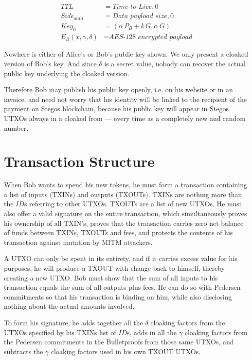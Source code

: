 \documentclass[8pt,fleqn,openany]{book}
\begin{document}
\begin{align*}
TTL &= \textit{Time-to-Live}, 0 \\
Side_{data} &= \textit{Data payload size}, 0 \\
Key_{\alpha} &= (\alpha \, P_{B} + k \, G, \alpha \, G ) \\
E_B(x, \gamma, \delta) &= \textit{AES-128 encrypted payload}
\end{align*}

Nowhere is either of Alice’s or Bob’s public key shown. We only present a cloaked version of Bob’s key. And since $\delta$ is a secret value, nobody can recover the actual public key underlying the cloaked version. 

Therefore Bob may publish his public key openly, i.e. on his website or in an invoice, and need not worry that his identity will be linked to the recipient of the payment on Stegos blockchain, because his public key will appear in Stegos UTXOs always in a cloaked from — every time as a completely new and random number.

\section{Transaction Structure}

When Bob wants to spend his new tokens, he must form a transaction containing a list of inputs (TXINs) and outputs (TXOUTs). TXINs are nothing more than the $\mathit{ID}$s referring to other UTXOs. TXOUTs are a list of new UTXOs. He must also offer a valid signature on the entire transaction, which simultaneously proves his ownership of all TXIN’s, proves that the transaction carries zero net balance of funds between TXINs, TXOUTs and fees, and protects the contents of his transaction against mutation by MITM attackers.

A UTXO can only be spent in its entirety, and if it carries excess value for his purposes, he will produce a TXOUT with change back to himself, thereby creating a new UTXO. Bob must show that the sum of all inputs to his transaction equals the sum of all outputs plus fees. He can do so with Pedersen commitments so that his transaction is binding on him, while also disclosing nothing about the actual amounts involved.

To form his signature, he adds together all the $\delta$ cloaking factors from the UTXOs specified by his TXINs list of $\mathit{ID}$s, adds in all the $\gamma$ cloaking factors from the Pedersen commitments in the Bulletproofs from those same UTXOs, and subtracts the $\gamma$ cloaking factors used in his own TXOUT UTXOs. 
\end{document}
